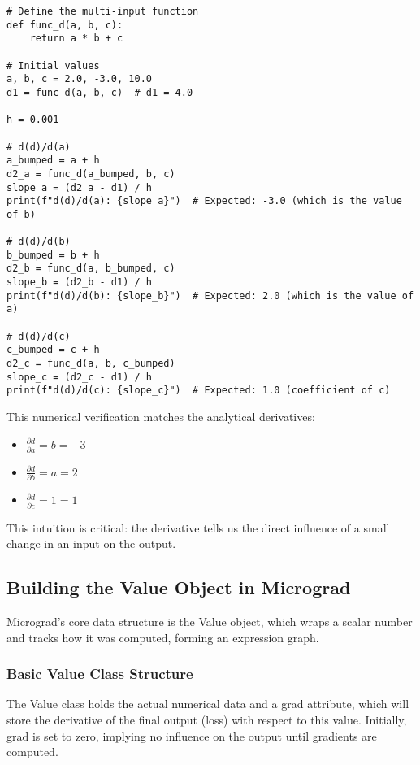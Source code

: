 \begin{lstlisting}[caption={Numerical Partial Derivative Calculation}]
# Define the multi-input function
def func_d(a, b, c): 
    return a * b + c

# Initial values
a, b, c = 2.0, -3.0, 10.0 
d1 = func_d(a, b, c)  # d1 = 4.0

h = 0.001

# d(d)/d(a)
a_bumped = a + h 
d2_a = func_d(a_bumped, b, c) 
slope_a = (d2_a - d1) / h 
print(f"d(d)/d(a): {slope_a}")  # Expected: -3.0 (which is the value of b)

# d(d)/d(b)
b_bumped = b + h 
d2_b = func_d(a, b_bumped, c) 
slope_b = (d2_b - d1) / h 
print(f"d(d)/d(b): {slope_b}")  # Expected: 2.0 (which is the value of a)

# d(d)/d(c)
c_bumped = c + h 
d2_c = func_d(a, b, c_bumped) 
slope_c = (d2_c - d1) / h 
print(f"d(d)/d(c): {slope_c}")  # Expected: 1.0 (coefficient of c) 
\end{lstlisting} 

This numerical verification matches the analytical derivatives: 
\begin{itemize} 
\item $\frac{\partial d}{\partial a} = b = -3$ 
\item $\frac{\partial d}{\partial b} = a = 2$ 
\item $\frac{\partial d}{\partial c} = 1 = 1$ 
\end{itemize} 
This intuition is critical: the derivative tells us the direct influence of a small change in an input on the output.

\subsection{Building the Value Object in Micrograd}
Micrograd's core data structure is the Value object, which wraps a scalar number and tracks how it was computed, forming an expression graph.

\subsubsection{Basic Value Class Structure} 
The Value class holds the actual numerical data and a grad attribute, which will store the derivative of the final output (loss) with respect to this value. Initially, grad is set to zero, implying no influence on the output until gradients are computed.

